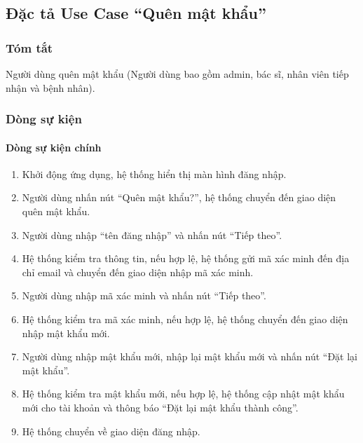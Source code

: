 \subsection{Đặc tả Use Case ``Quên mật khẩu''}

\subsubsection{Tóm tắt}
Người dùng quên mật khẩu (Người dùng bao gồm admin, bác sĩ, nhân viên tiếp nhận và bệnh nhân).

\subsubsection{Dòng sự kiện}
\paragraph{\textbf{Dòng sự kiện chính}}
\begin{enumerate}
    \item Khởi động ứng dụng, hệ thống hiển thị màn hình đăng nhập.
    \item Người dùng nhấn nút ``Quên mật khẩu?'', hệ thống chuyển đến giao diện quên mật khẩu.
    \item Người dùng nhập ``tên đăng nhập'' và nhấn nút ``Tiếp theo''.
    \item Hệ thống kiểm tra thông tin, nếu hợp lệ, hệ thống gửi mã xác minh đến địa chỉ email và chuyển đến giao diện nhập mã xác minh.
    \item Người dùng nhập mã xác minh và nhấn nút ``Tiếp theo''.
    \item Hệ thống kiểm tra mã xác minh, nếu hợp lệ, hệ thống chuyển đến giao diện nhập mật khẩu mới.
    \item Người dùng nhập mật khẩu mới, nhập lại mật khẩu mới và nhấn nút ``Đặt lại mật khẩu''.
    \item Hệ thống kiểm tra mật khẩu mới, nếu hợp lệ, hệ thống cập nhật mật khẩu mới cho tài khoản và thông báo ``Đặt lại mật khẩu thành công''.
    \item Hệ thống chuyển về giao diện đăng nhập.
\end{enumerate}


